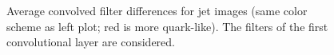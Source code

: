 \begin{figure}[htbp]
\begin{center}
\caption{
Average convolved filter differences for jet images (same color scheme as left plot; red is more quark-like). 
The filters of the first convolutional layer are considered.}
\label{fig:filters}
\end{center}
\end{figure}
